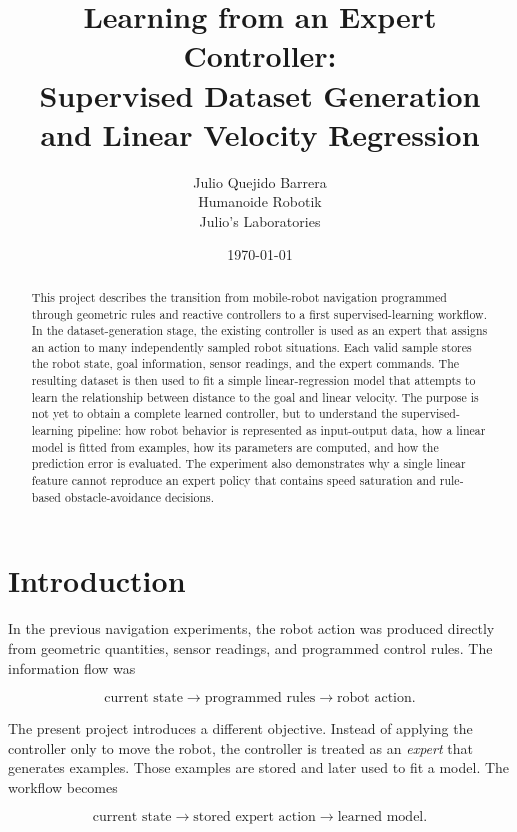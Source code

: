 \documentclass[10pt,twocolumn,a4paper]{article}
\title{
    \textbf{Learning from an Expert Controller:\\
    Supervised Dataset Generation\\
    and Linear Velocity Regression}
}
\author{
    Julio Quejido Barrera\\
    Humanoide Robotik\\
    Julio's Laboratories
}
\date{\today}
\begin{document}

\maketitle
\raggedbottom

\begin{abstract}
This project describes the transition from mobile-robot navigation programmed
through geometric rules and reactive controllers to a first supervised-learning
workflow. In the dataset-generation stage, the existing controller is used as
an expert that assigns an action to many independently sampled robot
situations. Each valid sample stores the robot state, goal information, sensor
readings, and the expert commands. The resulting dataset is then used to fit a
simple linear-regression model that attempts to learn the relationship between
distance to the goal and linear velocity. The purpose is not yet to obtain a
complete learned controller, but to understand the supervised-learning
pipeline: how robot behavior is represented as input-output data, how a linear
model is fitted from examples, how its parameters are computed, and how the
prediction error is evaluated. The experiment also demonstrates why a single
linear feature cannot reproduce an expert policy that contains speed
saturation and rule-based obstacle-avoidance decisions.
\end{abstract}

\section{Introduction}

In the previous navigation experiments, the robot action was produced directly
from geometric quantities, sensor readings, and programmed control rules. The
information flow was

\[
    \text{current state}
    \longrightarrow
    \text{programmed rules}
    \longrightarrow
    \text{robot action}.
\]

The present project introduces a different objective. Instead of applying the
controller only to move the robot, the controller is treated as an
\emph{expert} that generates examples. Those examples are stored and later
used to fit a model. The workflow becomes

\[
    \text{current state}
    \longrightarrow
    \text{stored expert action}
    \longrightarrow
    \text{learned model}.
\]
\end{document}
